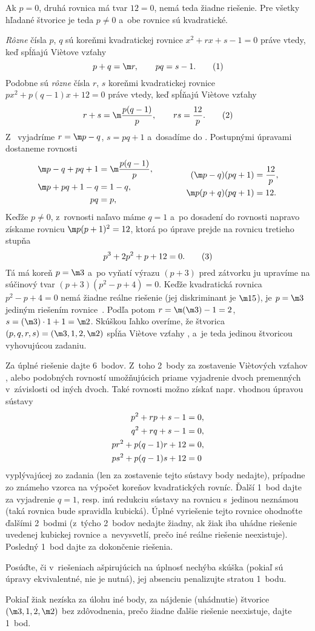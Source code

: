 {%
Ak $p=0$, druhá rovnica má tvar $12=0$, nemá teda žiadne riešenie. Pre všetky hľadané štvorice je teda $p\ne0$ a~obe rovnice sú kvadratické.

{\it Rôzne\/} čísla $p$, $q$ sú koreňmi kvadratickej rovnice $x^2+rx+s-1=0$ práve vtedy, keď spĺňajú Vi\`etove vzťahy
$$
p+q=\m r,\qquad pq=s-1.
\tag1
$$
Podobne sú {\it rôzne\/} čísla $r$, $s$ koreňmi kvadratickej rovnice $px^2+p(q-1)x+12=0$ práve vtedy, keď spĺňajú Vi\`etove vzťahy
$$
r+s=\m\frac{p(q-1)}p,\qquad rs=\frac{12}p.
\tag2
$$
Z~ vyjadríme $r=\m p-q$, $s=pq+1$ a~dosadíme do . Postupnými úpravami dostaneme rovnosti
$$
\aligned
  \m p-q+pq+1&=\m\frac{p(q-1)}p,\\
  \m p+pq+1-q&=1-q,\\
           pq&=p,
\endaligned
\qquad\qquad
\aligned
  (\m p-q)(pq+1)&=\frac{12}p,\\
  \m p(p+q)(pq+1)&=12.
\endaligned
$$
Keďže $p\ne0$, z~rovnosti naľavo máme $q=1$ a~po dosadení do rovnosti napravo získame rovnicu $\m p(p+1)^2=12$, ktorá po úprave prejde na rovnicu tretieho stupňa
$$
  p^3+2p^2+p+12=0.
\tag3
$$
Tá má koreň $p=\m3$ a~po vyňatí výrazu $(p+3)$ pred zátvorku ju upravíme na súčinový tvar $(p+3)(p^2-p+4)=0$. Keďže kvadratická rovnica $p^2-p+4=0$ nemá žiadne reálne riešenie (jej diskriminant je $\m15$), je $p=\m3$ jediným riešením rovnice~. Podľa  potom $r=\m(\m3)-1=2$, $s=(\m3)\cdot1+1=\m2$. Skúškou ľahko overíme, že štvorica $(p,q,r,s)=(\m3,1,2,\m2)$ spĺňa Vi\`etove vzťahy ,  a~je teda jedinou štvoricou vyhovujúcou zadaniu.

\nobreak\medskip\petit\noindent
Za úplné riešenie dajte 6~bodov. Z~toho 2~body za zostavenie Vi\`etových vzťahov ,  alebo podobných rovností umožňujúcich priame vyjadrenie dvoch premenných v~závislosti od iných dvoch. Také rovnosti možno získať napr. vhodnou úpravou sústavy
$$
\aligned
  p^2+rp+s-1&=0,\\
  q^2+rq+s-1&=0,\\
  pr^2+p(q-1)r+12&=0,\\
  ps^2+p(q-1)s+12&=0
\endaligned
$$
vyplývajúcej zo zadania (len za zostavenie tejto sústavy body nedajte), prípadne zo známeho vzorca na výpočet koreňov kvadratických rovníc. Ďalší 1~bod dajte za vyjadrenie $q=1$, resp. inú redukciu sústavy na rovnicu s~jedinou neznámou (taká rovnica bude spravidla kubická). Úplné vyriešenie tejto rovnice ohodnoťte ďalšími 2~bodmi (z~týcho 2~bodov nedajte žiadny, ak žiak iba uhádne riešenie uvedenej kubickej rovnice a~nevysvetlí, prečo iné reálne riešenie neexistuje). Posledný 1~bod dajte za dokončenie riešenia.

Posúďte, či v~riešeniach ašpirujúcich na úplnosť nechýba skúška (pokiaľ sú úpravy ekvivalentné, nie je nutná),
jej absenciu penalizujte stratou 1~bodu.

Pokiaľ žiak nezíska za úlohu iné body, za nájdenie (uhádnutie) štvorice $(\m3,1,2,\m2)$ bez zdôvodnenia, prečo žiadne ďalšie riešenie neexistuje, dajte 1~bod.

\endpetit
\bigbreak}

